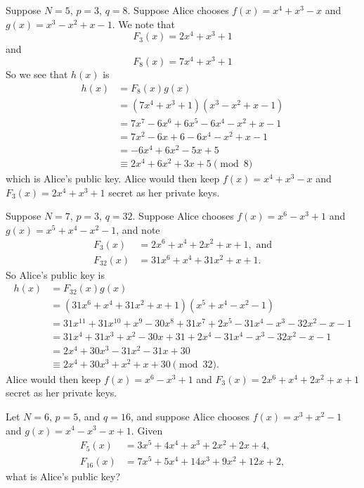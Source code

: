 \begin{example}
    Suppose $N = 5$, $p = 3$, $q = 8$. Suppose Alice chooses $f(x) = x^4 + x^3 - x$ and $g(x) = x^3 - x^2 + x - 1$. We note that
    \[
        F_3(x) = 2x^4 + x^3 + 1
    \]
    and
    \[
        F_8(x) = 7x^4 + x^3 + 1
    \]
    So we see that $h(x)$ is
    \begin{align*}
        h(x) &= F_8(x)g(x)\\
        &= (7x^4 + x^3 + 1)(x^3 - x^2 + x - 1)\\
        &= 7x^7 - 6x^6 + 6x^5 - 6x^4 - x^2 + x - 1\\
        &= 7x^2 - 6x + 6 - 6x^4 - x^2 + x - 1\\
        &= -6x^4 + 6x^2 - 5x + 5\\
        &\equiv 2x^4 + 6x^2 + 3x + 5 \pmod8
    \end{align*}
    which is Alice's public key. Alice would then keep $f(x) = x^4 + x^3 - x$ and $F_3(x) = 2x^4 + x^3 + 1$ secret as her private keys.
\end{example}
\begin{example}
    Suppose $N = 7$, $p = 3$, $q = 32$. Suppose Alice chooses $f(x) = x^6 - x^3 + 1$ and $g(x) = x^5 + x^4 - x^2 - 1$, and note
    \begin{align*}
        F_3(x) &= 2x^6 + x^4 + 2x^2 + x + 1, \text{ and}\\
        F_{32}(x) &= 31x^6 + x^4 + 31x^2 + x + 1.
    \end{align*}
    So Alice's public key is
    \begin{align*}
        h(x) &= F_{32}(x)g(x)\\
        &= (31x^6 + x^4 + 31x^2 + x + 1)(x^5 + x^4 - x^2 - 1)\\
        &= 31x^{11} + 31x^{10} + x^9 - 30x^8 + 31x^7 + 2x^5 - 31x^4 - x^3 - 32x^2 - x - 1\\
        &= 31x^4 + 31x^3 + x^2 - 30x + 31 + 2x^4 - 31x^4 - x^3 - 32x^2 - x - 1\\
        &= 2x^4 + 30x^3 - 31x^2 - 31x + 30\\
        &\equiv 2x^4 + 30x^3 + x^2 + x + 30 \pmod{32}.
    \end{align*}
    Alice would then keep $f(x) = x^6 - x^3 + 1$ and $F_3(x) = 2x^6 + x^4 + 2x^2 + x + 1$ secret as her private keys.
\end{example}

\begin{exercise}
    Let $N = 6$, $p = 5$, and $q = 16$, and suppose Alice chooses $f(x) = x^3 + x^2 - 1$ and $g(x) = x^4 - x^3 - x + 1$. Given
    \begin{align*}
        F_5(x) &= 3x^5 + 4x^4 + x^3 + 2x^2 + 2x + 4,\\
        F_{16}(x) &= 7x^5 + 5x^4 + 14x^3 + 9x^2 + 12x + 2,
    \end{align*}
    what is Alice's public key?
\end{exercise}

